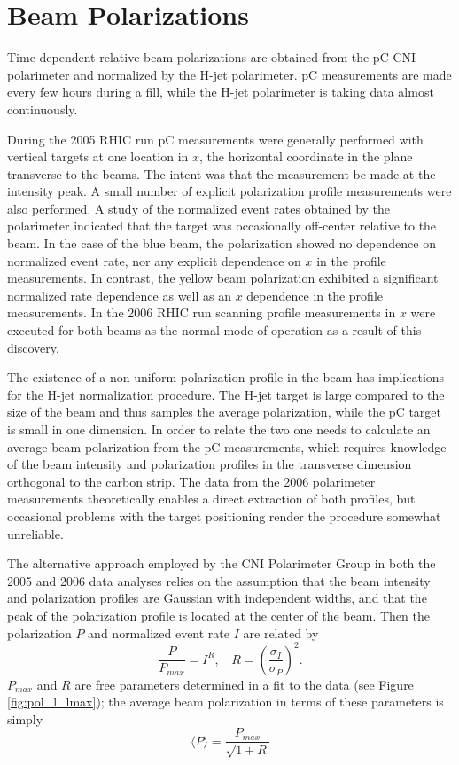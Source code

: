 \section{Beam Polarizations}

Time-dependent relative beam polarizations are obtained from the pC CNI
polarimeter and normalized by the H-jet polarimeter. pC measurements are made
every few hours during a fill, while the H-jet polarimeter is taking data
almost continuously.

During the 2005 RHIC run pC measurements were generally performed with
vertical targets at one location in \(x\), the horizontal coordinate in the
plane transverse to the beams. The intent was that the measurement be made at
the intensity peak. A small number of explicit polarization profile
measurements were also performed. A study of the normalized event rates
obtained by the polarimeter indicated that the target was occasionally
off-center relative to the beam. In the case of the blue beam, the
polarization showed no dependence on normalized event rate, nor any explicit
dependence on \(x\) in the profile measurements. In contrast, the yellow beam
polarization exhibited a significant normalized rate dependence as well as an
\(x\) dependence in the profile measurements. In the 2006 RHIC run scanning
profile measurements in \(x\) were executed for both beams as the normal mode
of operation as a result of this discovery.

The existence of a non-uniform polarization profile in the beam has
implications for the H-jet normalization procedure. The H-jet target is large
compared to the size of the beam and thus samples the average polarization,
while the pC target is small in one dimension. In order to relate the two one
needs to calculate an average beam polarization from the pC measurements,
which requires knowledge of the beam intensity and polarization profiles in
the transverse dimension orthogonal to the carbon strip. The data from the
2006 polarimeter measurements theoretically enables a direct extraction of
both profiles, but occasional problems with the target positioning render the
procedure somewhat unreliable.

The alternative approach employed by the CNI Polarimeter Group in both the
2005 and 2006 data analyses relies on the assumption that the beam intensity
and polarization profiles are Gaussian with independent widths, and that the
peak of the polarization profile is located at the center of the beam. Then
the polarization \(P\) and normalized event rate \(I\) are related by
%
\begin{equation}
  \frac{P}{P_{max}} = I^R, ~~~~ R=\left(\frac{\sigma_I}{\sigma_P}\right)^2.
  \label{eqn:polarization}
\end{equation}
%
\(P_{max}\) and \(R\) are free parameters determined in a fit to the data (see
Figure \ref{fig:pol_l_lmax}); the average beam polarization in terms of these
parameters is simply
%
\begin{equation}
  \langle P \rangle = \frac{P_{max}}{\sqrt{1+R}}
\end{equation}


